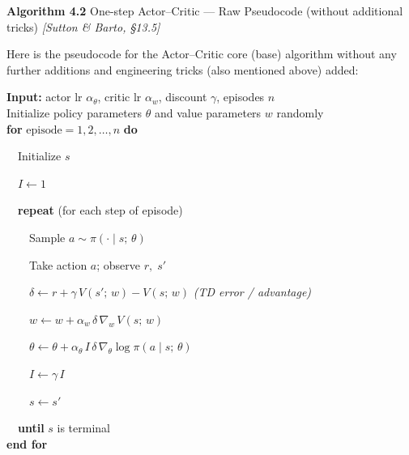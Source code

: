 \documentclass[11pt]{article}
\begin{document}
    \label{pseudo-4-2}

    \begin{pseudobox}

\textbf{Algorithm 4.2} One-step Actor--Critic --- Raw Pseudocode
(without additional tricks) \emph{{[}Sutton \& Barto, §13.5{]}}

\tcbline

Here is the pseudocode for the Actor--Critic core (base) algorithm
without any further additions and engineering tricks (also mentioned
above) added:

\textbf{Input:} actor lr \(\alpha_\theta\), critic lr \(\alpha_w\),
discount \(\gamma\), episodes \(n\)\\
Initialize policy parameters \(\theta\) and value parameters \(w\)
randomly\\
\textbf{for} \(\text{episode} = 1, 2, \ldots, n\) \textbf{do}\\
\strut ~~Initialize \(s\)\\
\strut ~~\(I \leftarrow 1\)\\
\strut ~~\textbf{repeat} (for each step of episode)\\
\strut ~~~~Sample \(a \sim \pi(\cdot \mid s;\, \theta)\)\\
\strut ~~~~Take action \(a\); observe \(r,\; s'\)\\
\strut ~~~~\(\delta \leftarrow r + \gamma\, V(s';\, w) - V(s;\, w)\)
\emph{(TD error / advantage)}\\
\strut ~~~~\(w \leftarrow w + \alpha_w\, \delta\, \nabla_{w}\, V(s;\, w)\)\\
\strut ~~~~\(\theta \leftarrow \theta + \alpha_\theta\, I\, \delta\, \nabla_{\theta} \log \pi(a \mid s;\, \theta)\)\\
\strut ~~~~\(I \leftarrow \gamma\, I\)\\
\strut ~~~~\(s \leftarrow s'\)\\
\strut ~~\textbf{until} \(s\) is terminal\\
\textbf{end for}

\end{pseudobox}
\end{document}
